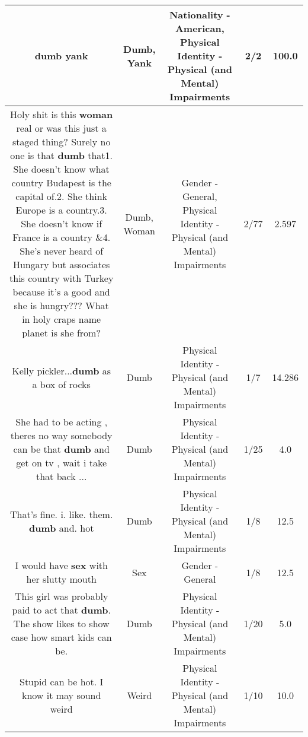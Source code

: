\documentclass[11pt]{article}
\newlength\mylength
\begin{document}
\begin{center}
\begin{longtable}{|C{.65\mylength}|C{.30\mylength}|C{.12\mylength}|C{.12\mylength}|C{.12\mylength}|}
  \small dumb yank\normalsize   & Dumb, Yank & Nationality - American, Physical Identity - Physical (and Mental) Impairments & 2/2 & 100.0 \\  \hline
  \small Holy shit is this \textbf{woman} real or was this just a staged thing? Surely no one is that \textbf{dumb} that1. She doesn't know what country Budapest is the capital of.2. She think Europe is a country.3. She doesn't know if France is a country \&4. She's never heard of Hungary but associates this country with Turkey because it's a good and she is hungry??? What in holy craps name planet is she from?\normalsize   & Dumb, Woman & Gender - General, Physical Identity - Physical (and Mental) Impairments & 2/77 & 2.597 \\  \hline
  \small Kelly pickler...\textbf{dumb} as a box of rocks\normalsize   & Dumb & Physical Identity - Physical (and Mental) Impairments & 1/7 & 14.286 \\  \hline
  \small She had to be acting , theres no way somebody can be that \textbf{dumb} and get on tv , wait i take that back ...\normalsize   & Dumb & Physical Identity - Physical (and Mental) Impairments & 1/25 & 4.0 \\  \hline
  \small That's fine. i. like. them. \textbf{dumb} and. hot\normalsize   & Dumb & Physical Identity - Physical (and Mental) Impairments & 1/8 & 12.5 \\  \hline
  \small I would have \textbf{sex} with her slutty mouth\normalsize   & Sex & Gender - General & 1/8 & 12.5 \\  \hline
  \small This girl was probably paid to act that \textbf{dumb}. The show likes to show case how smart kids can be.\normalsize   & Dumb & Physical Identity - Physical (and Mental) Impairments & 1/20 & 5.0 \\  \hline
  \small Stupid can be hot. I know it may sound weird\normalsize   & Weird & Physical Identity - Physical (and Mental) Impairments & 1/10 & 10.0 \\  \hline

\end{longtable}
\end{center}
\end{document}
